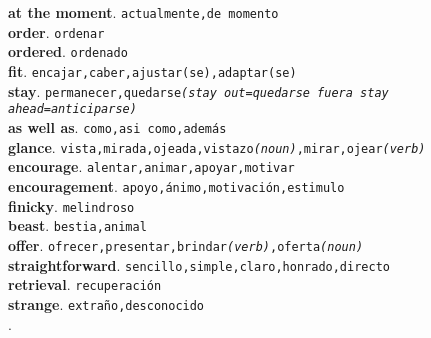 \documentclass[twocolumn]{article}
\begin{document}
	\textsf{\textbf{at the moment}}. \texttt{actualmente,de momento}\\
	\textsf{\textbf{order}}. \texttt{ordenar}\\
	\textsf{\textbf{ordered}}. \texttt{ordenado}\\
	\textsf{\textbf{fit}}. \texttt{encajar,caber,ajustar(se),adaptar(se)}\\
	\textsf{\textbf{stay}}. \texttt{permanecer,quedarse{\scriptsize \textsl{(stay out=quedarse fuera stay ahead=anticiparse)}}}\\
	\textsf{\textbf{as well as}}. \texttt{como,asi como,adem\'as}\\
	\textsf{\textbf{glance}}. \texttt{vista,mirada,ojeada,vistazo{\scriptsize \textsl{(noun)}},mirar,ojear{\scriptsize \textsl{(verb)}}}\\
	\textsf{\textbf{encourage}}. \texttt{alentar,animar,apoyar,motivar}\\
	\textsf{\textbf{encouragement}}. \texttt{apoyo,\'animo,motivaci\'on,estimulo}\\
	\textsf{\textbf{finicky}}. \texttt{melindroso}\\
	\textsf{\textbf{beast}}. \texttt{bestia,animal}\\
	\textsf{\textbf{offer}}. \texttt{ofrecer,presentar,brindar{\scriptsize \textsl{(verb)}},oferta{\scriptsize \textsl{(noun)}}}\\
	\textsf{\textbf{straightforward}}. \texttt{sencillo,simple,claro,honrado,directo}\\
	\textsf{\textbf{retrieval}}. \texttt{recuperaci\'on}\\
	\textsf{\textbf{strange}}. \texttt{extra\~no,desconocido}\\
	\textsf{\textbf{}}. \texttt{}\\
\end{document}
